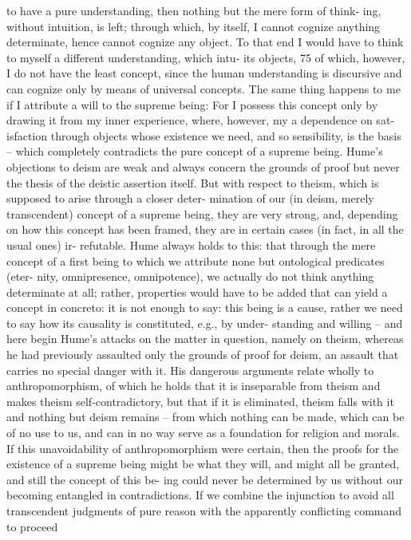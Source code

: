 to have a pure understanding, then nothing but the mere form of think-
ing, without intuition, is left; through which, by itself, I cannot cognize
anything determinate, hence cannot cognize any object. To that end I
would have to think to myself a different understanding, which intu-
its objects, 75 of which, however, I do not have the least concept, since
the human understanding is discursive and can cognize only by means
of universal concepts. The same thing happens to me if I attribute a
will to the supreme being: For I possess this concept only by drawing
it from my inner experience, where, however, my a dependence on sat-
isfaction through objects whose existence we need, and so sensibility, is
the basis – which completely contradicts the pure concept of a supreme
being.
Hume’s objections to deism are weak and always concern the grounds
of proof but never the thesis of the deistic assertion itself. But with
respect to theism, which is supposed to arise through a closer deter-
mination of our (in deism, merely transcendent) concept of a supreme
being, they are very strong, and, depending on how this concept has
been framed, they are in certain cases (in fact, in all the usual ones) ir-
refutable. Hume always holds to this: that through the mere concept of
a ﬁrst being to which we attribute none but ontological predicates (eter-
nity, omnipresence, omnipotence), we actually do not think anything
determinate at all; rather, properties would have to be added that can
yield a concept in concreto: it is not enough to say: this being is a cause,
rather we need to say how its causality is constituted, e.g., by under-
standing and willing – and here begin Hume’s attacks on the matter in
question, namely on theism, whereas he had previously assaulted only
the grounds of proof for deism, an assault that carries no special danger
with it. His dangerous arguments relate wholly to anthropomorphism,
of which he holds that it is inseparable from theism and makes theism
self-contradictory, but that if it is eliminated, theism falls with it and
nothing but deism remains – from which nothing can be made, which
can be of no use to us, and can in no way serve as a foundation for
religion and morals. If this unavoidability of anthropomorphism were
certain, then the proofs for the existence of a supreme being might be
what they will, and might all be granted, and still the concept of this be-
ing could never be determined by us without our becoming entangled in
contradictions.
If we combine the injunction to avoid all transcendent judgments
of pure reason with the apparently conﬂicting command to proceed
